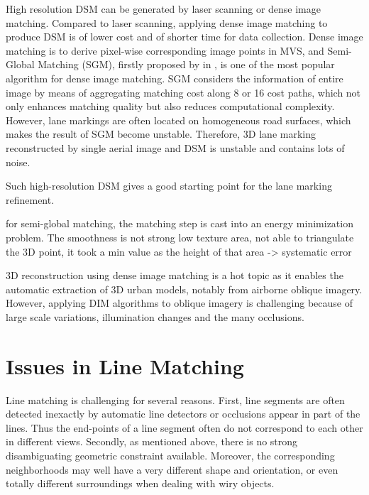 High resolution DSM can be generated by laser scanning or dense image matching. Compared to laser scanning, applying dense image matching to produce DSM is of lower cost and of shorter time for data collection. Dense image matching is to derive pixel-wise corresponding image points in MVS, and Semi-Global Matching (SGM), firstly proposed by \citeauthor{Hirschmüller2008} in \citeyear{Hirschmüller2008}, is one of the most popular algorithm for dense image matching. SGM considers the information of entire image by means of aggregating matching cost along 8 or 16 cost paths, which not only enhances matching quality but also reduces computational complexity. However, lane markings are often located on homogeneous road surfaces, which makes the result of SGM become unstable. Therefore, 3D lane marking reconstructed by single aerial image and DSM is unstable and contains lots of noise. %

Such high-resolution DSM gives a good starting point for the lane marking refinement.

for semi-global matching, the matching step is cast into an energy minimization problem.
The smoothness is not strong
low texture area, not able to triangulate the 3D point, it took a min value as the height of that area -> systematic error


3D reconstruction using dense image matching is a hot topic as it enables the automatic extraction of 3D urban models, notably from airborne oblique imagery. However, applying DIM algorithms to oblique imagery is challenging because of large scale variations, illumination changes and the many occlusions.



\section{Issues in Line Matching}

Line matching is challenging for several reasons. First, line segments are often detected inexactly by automatic line detectors or occlusions appear in part of the lines. Thus the end-points of a line segment often do not correspond to each other in different views. Secondly, as mentioned above, there is no strong disambiguating geometric constraint available. Moreover, the corresponding neighborhoods may well have a very different shape and orientation, or even totally different surroundings when dealing with wiry objects.\cite{SchmidJun1997,HoferFeb2013}

